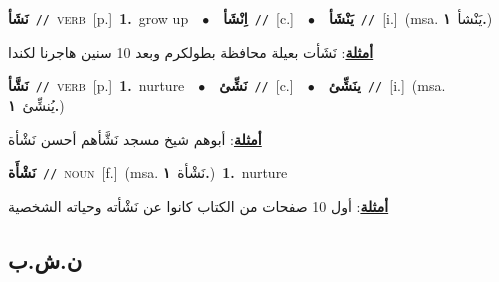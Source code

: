 \documentclass[10pt,a4paper,twoside]{article} %
\begin{document}
\begin{multicols}{2}
{\setlength\topsep{0pt}\textbf{\foreignlanguage{arabic}{نَشَأ}}\ {\color{gray}\texttt{//}\color{black}}\ \textsc{verb}\ [p.]\ \textbf{1.}~grow up\ \ $\bullet$\ \ \setlength\topsep{0pt}\textbf{\foreignlanguage{arabic}{اِنْشَأ}}\ {\color{gray}\texttt{//}\color{black}}\ [c.]\ \ $\bullet$\ \ \setlength\topsep{0pt}\textbf{\foreignlanguage{arabic}{يَنْشَأ}}\ {\color{gray}\texttt{//}\color{black}}\ [i.]\ \color{gray}(msa. \foreignlanguage{arabic}{يَنْشأ}~\foreignlanguage{arabic}{\textbf{١.}})\color{black}\  \begin{flushright}\color{gray}\foreignlanguage{arabic}{\textbf{\underline{\foreignlanguage{arabic}{أمثلة}}}: نَشَأت بعيلة محافظة بطولكرم وبعد 10 سنين هاجرنا لكندا}\end{flushright}\color{black}} \vspace{2mm}

{\setlength\topsep{0pt}\textbf{\foreignlanguage{arabic}{نَشَّأ}}\ {\color{gray}\texttt{//}\color{black}}\ \textsc{verb}\ [p.]\ \textbf{1.}~nurture\ \ $\bullet$\ \ \setlength\topsep{0pt}\textbf{\foreignlanguage{arabic}{نَشِّئ}}\ {\color{gray}\texttt{//}\color{black}}\ [c.]\ \ $\bullet$\ \ \setlength\topsep{0pt}\textbf{\foreignlanguage{arabic}{ينَشِّئ}}\ {\color{gray}\texttt{//}\color{black}}\ [i.]\ \color{gray}(msa. \foreignlanguage{arabic}{يُنشِّئ}~\foreignlanguage{arabic}{\textbf{١.}})\color{black}\  \begin{flushright}\color{gray}\foreignlanguage{arabic}{\textbf{\underline{\foreignlanguage{arabic}{أمثلة}}}: أبوهم شيخ مسجد نَشَّأهم أحسن نَشْأة}\end{flushright}\color{black}} \vspace{2mm}

{\setlength\topsep{0pt}\textbf{\foreignlanguage{arabic}{نَشْأَة}}\ {\color{gray}\texttt{//}\color{black}}\ \textsc{noun}\ [f.]\ \color{gray}(msa. \foreignlanguage{arabic}{نَشْأة}~\foreignlanguage{arabic}{\textbf{١.}})\color{black}\ \textbf{1.}~nurture\  \begin{flushright}\color{gray}\foreignlanguage{arabic}{\textbf{\underline{\foreignlanguage{arabic}{أمثلة}}}: أول 10 صفحات من الكتاب كانوا عن نَشْأته وحياته الشخصية}\end{flushright}\color{black}} \vspace{2mm}

\vspace{-3mm}
\subsection*{\color{blue}\foreignlanguage{arabic}{ن.ش.ب}\color{blue}{}} 


\end{multicols}
\end{document}
